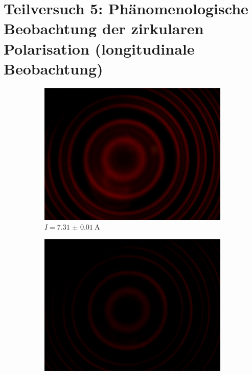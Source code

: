 \section{Teilversuch 5: Phänomenologische Beobachtung der zirkularen Polarisation (longitudinale Beobachtung)}
	\begin{figure}[!ht]
	    \centering
	   	\begin{subfigure}{0.48\textwidth}
			\centering
			\includegraphics[width=\textwidth]{images/Capture_825.bmp.jpg}
			\caption{$I = \SI{7.31(1)}{\ampere}$}
			\vspace{0.5\baselineskip}
		\end{subfigure}
		\hfill
		\begin{subfigure}{0.48\textwidth}
			\centering
			\includegraphics[width=\textwidth]{images/Capture_826.bmp.jpg}

\end{subfigure}
\end{figure}
